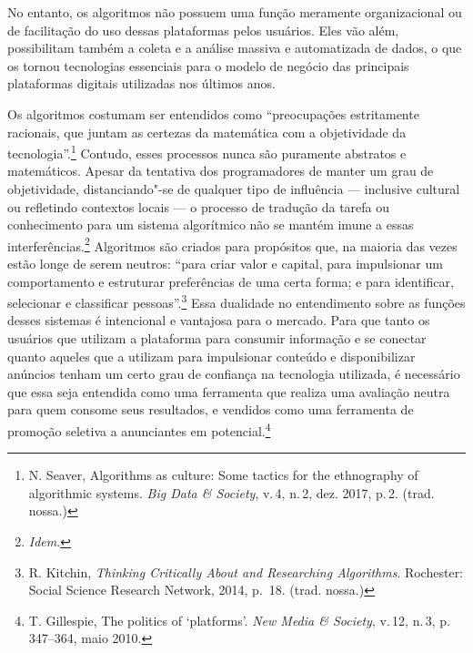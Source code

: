 No entanto, os algoritmos não possuem uma função meramente
organizacional ou de facilitação do uso dessas plataformas pelos
usuários. Eles vão além, possibilitam também a coleta e a análise
massiva e automatizada de dados, o que os tornou tecnologias essenciais
para o modelo de negócio das principais plataformas digitais utilizadas
nos últimos anos.

Os algoritmos costumam ser entendidos como ``preocupações estritamente
racionais, que juntam as certezas da matemática com a objetividade da
tecnologia''.\footnote{N. Seaver, Algorithms as culture: Some tactics for the ethnography of algorithmic systems. \textit{Big Data \& Society}, v.\,4, n.\,2, dez. 2017, p.\,2. (trad. nossa.)}
Contudo, esses processos nunca são puramente abstratos e matemáticos.
Apesar da tentativa dos programadores de manter um grau de objetividade,
distanciando"-se de qualquer tipo de influência --- inclusive cultural ou
refletindo contextos locais --- o processo de tradução da tarefa ou
conhecimento para um sistema algorítmico não se mantém imune a essas
interferências.\footnote{\textit{Idem}.} Algoritmos são criados para propósitos que, na
maioria das vezes estão longe de serem neutros: ``para criar valor e
capital, para impulsionar um comportamento e estruturar preferências de
uma certa forma; e para identificar, selecionar e classificar
pessoas''.\footnote{R. Kitchin, \textit{Thinking Critically About and Researching
Algorithms}. Rochester: Social Science Research Network, 2014, p.\, 18. (trad. nossa.)} Essa dualidade no
entendimento sobre as funções desses sistemas é intencional e vantajosa
para o mercado. Para que tanto os usuários que utilizam a plataforma
para consumir informação e se conectar quanto aqueles que a utilizam
para impulsionar conteúdo e disponibilizar anúncios tenham um certo grau
de confiança na tecnologia utilizada, é necessário que essa seja
entendida como uma ferramenta que realiza uma avaliação neutra para quem
consome seus resultados, e vendidos como uma ferramenta de promoção
seletiva a anunciantes em potencial.\footnote{T. Gillespie, The politics of `platforms'. \textit{New Media \& Society}, v.\,12, n.\,3, p.\,347--364, maio 2010.}


